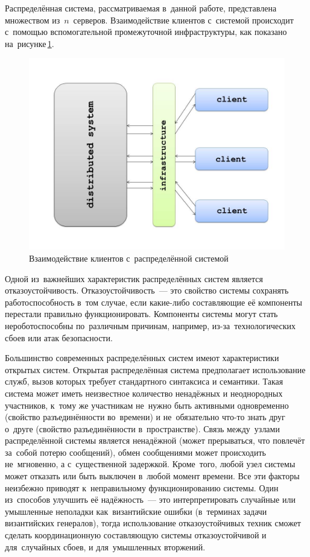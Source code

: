 Распределённая система, рассматриваемая в~данной работе, представлена множеством из~$n$~серверов. Взаимодействие клиентов с~системой происходит с~помощью вспомогательной промежуточной инфраструктуры, как показано на~рисунке\,\ref{clser}.
\begin{figure}[H]
	\centering \includegraphics[width=0.7 \textwidth, height=0.5 \textwidth]{img/ClientServer}  \caption{Взаимодействие клиентов с~распределённой системой} \label{clser}
\end{figure}

Одной из~важнейших характеристик распределённых систем является отказоустойчивость. Отказоустойчивость~--- это свойство системы сохранять работоспособность в~том случае, если какие-либо составляющие её компоненты перестали правильно функционировать. Компоненты системы могут стать нероботоспособны по~различным причинам, например, из-за~технологических сбоев или атак безопасности.

Большинство современных распределённых систем имеют характеристики открытых систем. Открытая распределённая система предполагает использование служб, вызов которых требует стандартного синтаксиса и семантики. Такая система может иметь неизвестное количество ненадёжных и неоднородных участников, к~тому же участникам не~нужно быть активными одновременно (свойство разъединённости во~времени) и не~обязательно что-то знать друг о~друге (свойство разъединённости в~пространстве). Связь между~узлами распределённой системы является ненадёжной (может прерываться, что повлечёт за~собой потерю сообщений), обмен сообщениями может происходить не~мгновенно, а с~существенной задержкой. Кроме~того, любой узел системы может отказать или быть выключен в~любой момент времени. Все эти факторы неизбежно приводят к~неправильному функционированию системы. Один из~способов улучшить её надёжность~--- это интерпретировать случайные или умышленные неполадки как~византийские ошибки (в~терминах задачи византийских генералов), тогда использование отказоустойчивых техник сможет сделать координационную составляющую системы отказоустойчивой и для~случайных сбоев, и для~умышленных вторжений.

